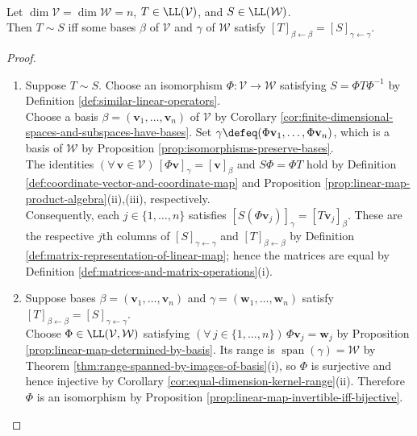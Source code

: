 \begin{proposition} \label{prop:operator-similarity-and-common-matrices} \\
Let $\dim\mathcal{V}=\dim\mathcal{W}=n$, $T\in\LL(\mathcal{V})$, and $S\in\LL(\mathcal{W})$.\\
Then $T\sim S$ iff some bases $\beta$ of $\mathcal{V}$ and $\gamma$ of $\mathcal{W}$ satisfy $[T]_{\beta\leftarrow\beta}=[S]_{\gamma\leftarrow\gamma}$.
\begin{proof}
\begin{enumerate}[label=\roman*.]
\setlength{\itemsep}{0pt}
\item[$(\Rightarrow)$] Suppose $T\sim S$. Choose an isomorphism $\Phi:\mathcal{V}\to\mathcal{W}$ satisfying $S=\Phi T\Phi^{-1}$ by Definition \ref{def:similar-linear-operators}.\\
Choose a basis $\beta=(\mathbf{v}_1,\ldots,\mathbf{v}_n)$ of $\mathcal{V}$ by Corollary \ref{cor:finite-dimensional-spaces-and-subspaces-have-bases}. Set $\gamma\defeq(\Phi\mathbf{v}_1,\ldots,\Phi\mathbf{v}_n)$, which is a basis of $\mathcal{W}$ by Proposition \ref{prop:isomorphisms-preserve-bases}.\\
The identities $(\forall\,\mathbf{v}\in\mathcal{V})\,[\Phi\mathbf{v}]_{\gamma}=[\mathbf{v}]_{\beta}$ and $S\Phi=\Phi T$ hold by Definition \ref{def:coordinate-vector-and-coordinate-map} and Proposition \ref{prop:linear-map-product-algebra}(ii),(iii), respectively.\\
Consequently, each $j\in\{1,\ldots,n\}$ satisfies $[S(\Phi\mathbf{v}_j)]_{\gamma}=[T\mathbf{v}_j]_{\beta}$. These are the respective $j$th columns of $[S]_{\gamma\leftarrow\gamma}$ and $[T]_{\beta\leftarrow\beta}$ by Definition \ref{def:matrix-representation-of-linear-map}; hence the matrices are equal by Definition \ref{def:matrices-and-matrix-operations}(i).
\item[$(\Leftarrow)$] Suppose bases $\beta=(\mathbf{v}_1,\ldots,\mathbf{v}_n)$ and $\gamma=(\mathbf{w}_1,\ldots,\mathbf{w}_n)$ satisfy $[T]_{\beta\leftarrow\beta}=[S]_{\gamma\leftarrow\gamma}$.\\
Choose $\Phi\in\LL(\mathcal{V},\mathcal{W})$ satisfying $(\forall\,j\in\{1,\ldots,n\})\,\Phi\mathbf{v}_j=\mathbf{w}_j$ by Proposition \ref{prop:linear-map-determined-by-basis}. Its range is $\operatorname{span}(\gamma)=\mathcal{W}$ by Theorem \ref{thm:range-spanned-by-images-of-basis}(i), so $\Phi$ is surjective and hence injective by Corollary \ref{cor:equal-dimension-kernel-range}(ii). Therefore $\Phi$ is an isomorphism by Proposition \ref{prop:linear-map-invertible-iff-bijective}.\\

\end{enumerate}
\end{proof}
\end{proposition}
